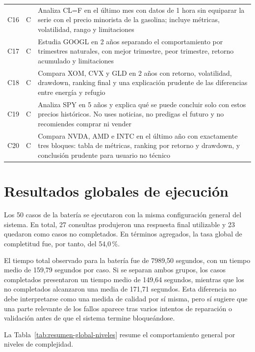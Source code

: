 \begin{longtable}{L{1.2cm}L{0.9cm}L{12.0cm}}
C16 & C & Analiza CL=F en el \'ultimo mes con datos de 1 hora sin equiparar la serie con el precio minorista de la gasolina; incluye m\'etricas, volatilidad, rango y limitaciones \\
C17 & C & Estudia GOOGL en 2 a\~nos separando el comportamiento por trimestres naturales, con mejor trimestre, peor trimestre, retorno acumulado y limitaciones \\
C18 & C & Compara XOM, CVX y GLD en 2 a\~nos con retorno, volatilidad, drawdown, ranking final y una explicaci\'on prudente de las diferencias entre energ\'ia y refugio \\
C19 & C & Analiza SPY en 5 a\~nos y explica qu\'e se puede concluir solo con estos precios hist\'oricos. No uses noticias, no predigas el futuro y no recomiendes comprar ni vender \\
C20 & C & Compara NVDA, AMD e INTC en el \'ultimo a\~no con exactamente tres bloques: tabla de m\'etricas, ranking por retorno y drawdown, y conclusi\'on prudente para usuario no t\'ecnico \\
\end{longtable}
\normalsize

\section{Resultados globales de ejecuci\'on}

Los 50 casos de la bater\'ia se ejecutaron con la misma configuraci\'on general del sistema. En total, 27 consultas 
produjeron una respuesta final utilizable y 23 quedaron como casos no completados. En t\'erminos agregados, la tasa global 
de completitud fue, por tanto, del 54,0\,\%.

El tiempo total observado para la bater\'ia fue de 7989,50 segundos, con un tiempo medio de 159,79 segundos por caso. Si se 
separan ambos grupos, los casos completados presentaron un tiempo medio de 149,64 segundos, mientras que los no completados 
alcanzaron una media de 171,71 segundos. Esta diferencia no debe interpretarse como una medida de calidad por s\'i misma, 
pero s\'i sugiere que una parte relevante de los fallos aparece tras varios intentos de reparaci\'on o validaci\'on antes de 
que el sistema termine bloque\'andose.

\pagebreak

La Tabla~\ref{tab:resumen-global-niveles} resume el comportamiento general por niveles de complejidad.

